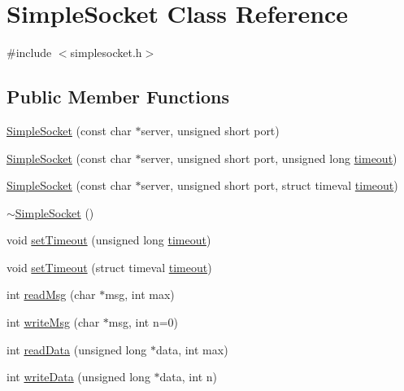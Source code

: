 \hypertarget{classSimpleSocket}{\section{Simple\-Socket Class Reference}
\label{classSimpleSocket}
}


{\ttfamily \#include $<$simplesocket.\-h$>$}

\subsection*{Public Member Functions}
\begin{DoxyCompactItemize}
\item 
\hyperlink{classSimpleSocket_ab743c534336f17d61023a808ec348877}{Simple\-Socket} (const char $\ast$server, unsigned short port)
\item 
\hyperlink{classSimpleSocket_aaaa3efe38c1c210643acd071115a8565}{Simple\-Socket} (const char $\ast$server, unsigned short port, unsigned long \hyperlink{classSimpleSocket_ac2e777bd36689f4f136b9c5b9e9c5f0e}{timeout})
\item 
\hyperlink{classSimpleSocket_a273bb8620aa05f75029f39e069e18e4f}{Simple\-Socket} (const char $\ast$server, unsigned short port, struct timeval \hyperlink{classSimpleSocket_ac2e777bd36689f4f136b9c5b9e9c5f0e}{timeout})
\item 
\hyperlink{classSimpleSocket_abf7d41536d2ecf56de1364d36db5fd67}{$\sim$\-Simple\-Socket} ()
\item 
void \hyperlink{classSimpleSocket_af8d68590cf2fd476dd7adf9681e68d1a}{set\-Timeout} (unsigned long \hyperlink{classSimpleSocket_ac2e777bd36689f4f136b9c5b9e9c5f0e}{timeout})
\item 
void \hyperlink{classSimpleSocket_aca833e1fd8c646100ba0c463ba68f527}{set\-Timeout} (struct timeval \hyperlink{classSimpleSocket_ac2e777bd36689f4f136b9c5b9e9c5f0e}{timeout})
\item 
int \hyperlink{classSimpleSocket_adf772ef82480b834bc3bc74ac0d21df9}{read\-Msg} (char $\ast$msg, int max)
\item 
int \hyperlink{classSimpleSocket_a095da277758577ab30ed76fabe130c89}{write\-Msg} (char $\ast$msg, int n=0)
\item 
int \hyperlink{classSimpleSocket_a8a8c2258b40fc70bc67405ef1f40e99b}{read\-Data} (unsigned long $\ast$data, int max)
\item 
int \hyperlink{classSimpleSocket_ab24262c3889678da11168ee6de116a28}{write\-Data} (unsigned long $\ast$data, int n)
\item 

\end{DoxyCompactItemize}
